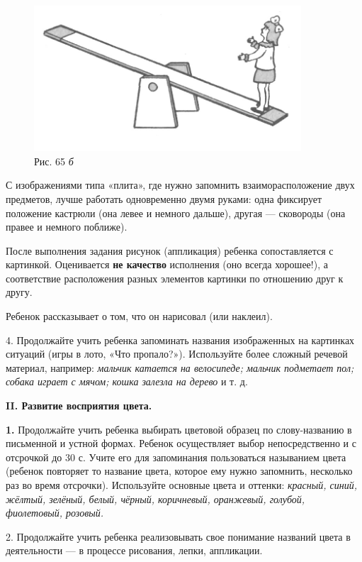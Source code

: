 \documentclass[a5paper]{book}
\renewcommand{\emph}[1]{\textit{#1}}
\begin{document}
\begin{figure}
\centering
\includegraphics[width=3.93174in,height=2.13694in]{media/media/image63.jpg}
\caption*{Рис. 65 \emph{б}}
\end{figure}



С изображениями типа «плита», где нужно запомнить взаиморасположение
двух предметов, лучше работать одновременно двумя руками: одна фиксирует
положение кастрюли (она левее и немного дальше), другая --- сковороды
(она правее и немного поближе).

После выполнения задания рисунок (аппликация) ребенка сопоставляется с
картинкой. Оценивается \textbf{не качество} исполнения (оно всегда
хорошее!), а соответствие расположения разных элементов картинки по
отношению друг к другу.

Ребенок рассказывает о том, что он нарисовал (или наклеил).

4. Продолжайте учить ребенка запоминать названия изображенных на
картинках ситуаций (игры в лото, «Что пропало?»). Используйте более
сложный речевой материал, например: \emph{мальчик катается на
велосипеде; мальчик подметает пол; собака играет с мячом; кошка залезла
на дерево} и т. д.

\textbf{II. Развитие восприятия цвета.}

\textbf{1.} Продолжайте учить ребенка выбирать цветовой образец по
слову-названию в письменной и устной формах. Ребенок осуществляет выбор
непосредственно и с отсрочкой до 30 с. Учите его для запоминания
пользоваться называнием цвета (ребенок повторяет то название цвета,
которое ему нужно запомнить, несколько раз во время отсрочки).
Используйте основные цвета и оттенки: \emph{красный, синий, жёлтый,
зелёный, белый, чёрный, коричневый, оранжевый, голубой, фиолетовый,
розовый.}

2. Продолжайте учить ребенка реализовывать свое понимание названий цвета
в деятельности --- в процессе рисования, лепки, аппликации.
\end{document}

